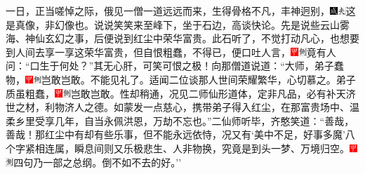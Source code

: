 一日，正当嗟悼之际，俄见一僧一道远远而来，生得骨格不凡，丰神迥别，{\includegraphics[width=3mm]{../Images/00005}\includegraphics[width=3mm]{../Images/00012}\footnotesize \kaishu 这是真像，非幻像也。}说说笑笑来至峰下，坐于石边，高谈快论。先是说些云山雾海、神仙玄幻之事，后便说到红尘中荣华富贵。此石听了，不觉打动凡心，也想要到人间去享一享这荣华富贵，但自恨粗蠢，不得已，便口吐人言，{\includegraphics[width=3mm]{../Images/00002}\includegraphics[width=3mm]{../Images/00011}\footnotesize \kaishu 竟有人问：``口生于何处？''其无心肝，可笑可恨之极！}向那僧道说道：``大师，弟子蠢物，{\includegraphics[width=3mm]{../Images/00002}\includegraphics[width=3mm]{../Images/00011}\footnotesize \kaishu 岂敢岂敢。}不能见礼了。适闻二位谈那人世间荣耀繁华，心切慕之。弟子质虽粗蠢，{\includegraphics[width=3mm]{../Images/00002}\includegraphics[width=3mm]{../Images/00011}\footnotesize \kaishu 岂敢岂敢。}性却稍通，况见二师仙形道体，定非凡品，必有补天济世之材，利物济人之德。如蒙发一点慈心，携带弟子得入红尘，在那富贵场中、温柔乡里受享几年，自当永佩洪恩，万劫不忘也。''二仙师听毕，齐憨笑道：``善哉，善哉！那红尘中有却有些乐事，但不能永远依恃，况又有`美中不足，好事多魔'八个字紧相连属，瞬息间则又乐极悲生、人非物换，究竟是到头一梦、万境归空。{\includegraphics[width=3mm]{../Images/00002}\includegraphics[width=3mm]{../Images/00011}\footnotesize \kaishu 四句乃一部之总纲。}倒不如不去的好。''

